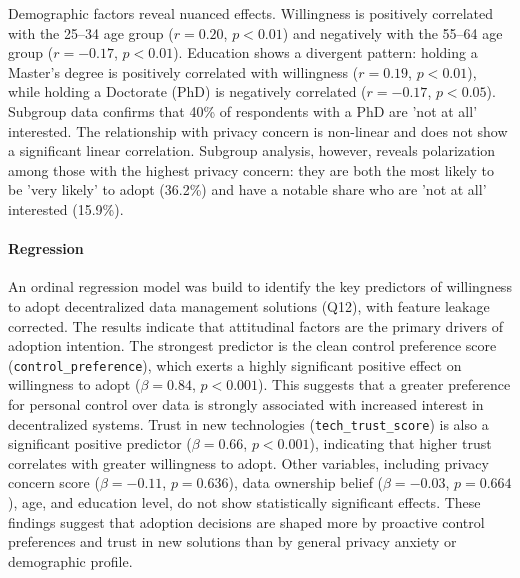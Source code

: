 	Demographic factors reveal nuanced effects. Willingness is positively correlated with the 25--34 age group ($r = 0.20$, $p < 0.01$) and negatively with the 55--64 age group ($r = -0.17$, $p < 0.01$). Education shows a divergent pattern: holding a Master's degree is positively correlated with willingness ($r = 0.19$, $p < 0.01$), while holding a Doctorate (PhD) is negatively correlated ($r = -0.17$, $p < 0.05$). Subgroup data confirms that 40\% of respondents with a PhD are 'not at all' interested.
	The relationship with privacy concern is non-linear and does not show a significant linear correlation. Subgroup analysis, however, reveals polarization among those with the highest privacy concern: they are both the most likely to be 'very likely' to adopt (36.2\%) and have a notable share who are 'not at all' interested (15.9\%).

	\paragraph{Regression}
	An ordinal regression model was build to identify the key predictors of willingness to adopt decentralized data management solutions (Q12),	with feature leakage corrected. The results indicate that attitudinal factors are the primary drivers of adoption intention.
	The strongest predictor is the clean control preference score (\texttt{control\_preference}), which exerts a highly significant positive effect on willingness to adopt ($\beta = 0.84$, $p < 0.001$). This suggests that a greater preference for personal control over data is strongly associated with increased interest in decentralized systems. Trust in new technologies (\texttt{tech\_trust\_score}) is also a significant positive predictor ($\beta = 0.66$, $p < 0.001$), indicating that higher trust correlates with greater willingness to adopt.
	Other variables, including privacy concern score ($\beta = -0.11$, $p = 0.636$), data ownership belief ($\beta = -0.03$, $p = 0.664$), age, and education level, do not show statistically significant effects. These findings suggest that adoption decisions are shaped more by proactive control preferences and trust in new solutions than by general privacy anxiety or demographic profile.

